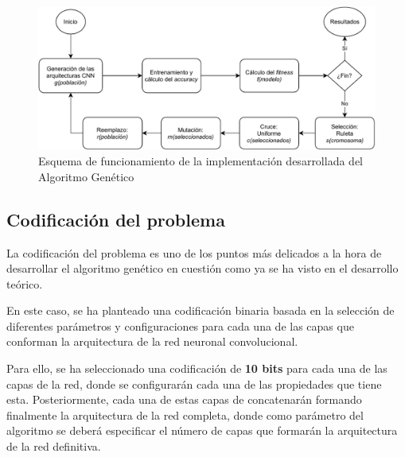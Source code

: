 \begin{figure} [h]
    \centering
    \includegraphics[width=\textwidth]{figuras/implementacion/esquema_funcionamiento.pdf}
    \caption{Esquema de funcionamiento de la implementación desarrollada del Algoritmo Genético}
    \label{fig:esquema_funcional_GA}
\end{figure}

\subsection{Codificación del problema}

La codificación del problema es uno de los puntos más delicados a la hora de desarrollar el algoritmo genético en cuestión como ya se ha visto en el desarrollo teórico.

En este caso, se ha planteado una codificación binaria basada en la selección de diferentes parámetros y configuraciones para cada una de las capas que conforman la arquitectura de la red neuronal convolucional.

Para ello, se ha seleccionado una codificación de \textbf{10 bits} para cada una de las capas de la red, donde se configurarán cada una de las propiedades que tiene esta. Posteriormente, cada una de estas capas de concatenarán formando finalmente la arquitectura de la red completa, donde como parámetro del algoritmo se deberá especificar el número de capas que formarán la arquitectura de la red definitiva.\\

